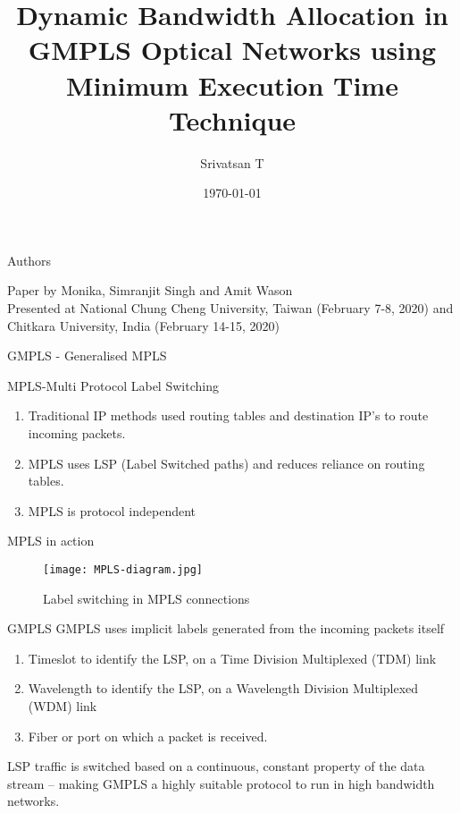\documentclass{beamer}
\title{Dynamic Bandwidth Allocation in GMPLS Optical Networks using Minimum Execution Time Technique}
\author{Srivatsan T}
\institute{IITH}
\date{\today}
\begin{document}
\begin{frame}
  \titlepage
\end{frame}
\begin{frame}{Authors}
  \begin{center}
  Paper by Monika, Simranjit Singh and Amit Wason\\
  Presented at National Chung Cheng University, Taiwan (February 7-8, 2020) and Chitkara University, India (February 14-15, 2020)
  \end{center}
\end{frame}
\begin{frame}{GMPLS - Generalised MPLS}
  \begin{block}{MPLS-Multi Protocol Label Switching}
    \begin{enumerate}
      \item Traditional IP methods used routing tables and destination IP's to route incoming packets.
      \item MPLS uses LSP (Label Switched paths) and reduces reliance on routing tables.
      \item MPLS is protocol independent
    \end{enumerate}
  \end{block}
\end{frame}
\begin{frame}{MPLS in action}
  \begin{figure}[!]
    \centering
    \texttt{[image: MPLS-diagram.jpg]}
    \caption{Label switching in MPLS connections}
  \end{figure}
\end{frame}
\begin{frame}{GMPLS}
  GMPLS uses implicit labels generated from the incoming packets itself
  \begin{block}{}
    \begin{enumerate}
      \item Timeslot to identify the LSP, on a Time Division Multiplexed (TDM) link
      \item Wavelength to identify the LSP, on a Wavelength Division Multiplexed (WDM) link
      \item Fiber or port on which a packet is received.
    \end{enumerate}
  \end{block}
  LSP traffic is switched based on a continuous, constant property of the data stream –
  making GMPLS a highly suitable protocol to run in high bandwidth networks.
\end{frame}
\end{document}

